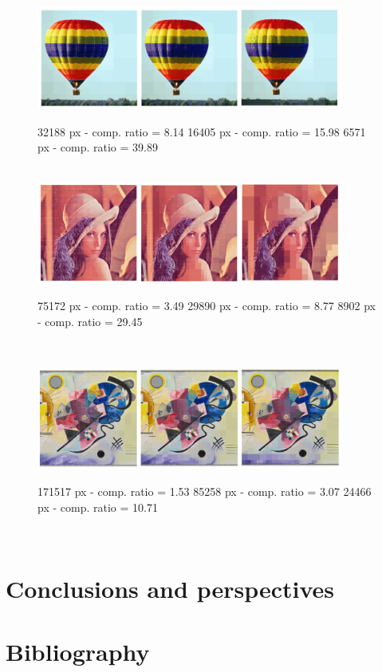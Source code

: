 \documentclass[8pt]{beamer}
\begin{document}
\begin{frame}
\begin{center}
 \begin{figure}[!h]
\includegraphics[width=0.9\textwidth]{./figures/s3_comp_small} \\
\begin{footnotesize}32188 px - comp. ratio = 8.14 \hfill 16405 px - comp. ratio = 15.98 \hfill 6571 px - comp. ratio = 39.89 \end{footnotesize} \\
\includegraphics[width=0.9\textwidth]{./figures/s4_comp_small}\\
\begin{footnotesize}75172 px - comp. ratio = 3.49 \hfill 29890 px - comp. ratio = 8.77 \hfill 8902 px - comp. ratio = 29.45 \end{footnotesize} \\
\end{figure}
\end{center}
\end{frame}

\begin{frame}
\begin{center}
 \begin{figure}[!h]
\includegraphics[width=0.9\textwidth]{./figures/s6_comp_small}\\
\begin{footnotesize}171517 px - comp. ratio = 1.53 \hfill 85258 px - comp. ratio = 3.07 \hfill 24466 px - comp. ratio = 10.71
\end{footnotesize} \\
\end{figure}
\end{center}
\end{frame}

\section{Conclusions and perspectives}

\section{Bibliography}
\end{document}
